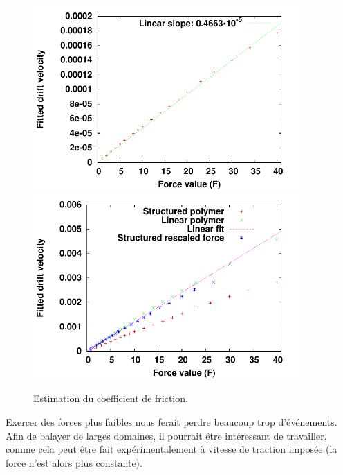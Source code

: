 \begin{figure}[H]
\begin{center}
\includegraphics[width=0.9\textwidth]{translofrictioncoefflargepore.pdf}
\includegraphics[width=0.9\textwidth]{largeporesfirction.pdf}



\caption[Friction et translocation, polymère structuré avec un pore large]{Estimation du coefficient de friction.}
\label{frictionholebigger}
\end{center}
\end{figure}



Exercer des forces plus faibles nous ferait perdre beaucoup trop d'événements. Afin de balayer de larges domaines, il pourrait être intéressant de travailler, comme cela peut être fait expérimentalement à vitesse de traction imposée (la force n'est alors plus constante).



